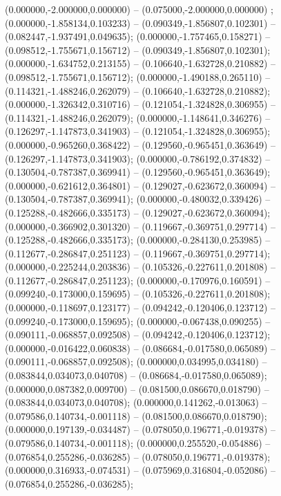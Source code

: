  (0.000000,-2.000000,0.000000) -- (0.075000,-2.000000,0.000000) ;
 (0.000000,-1.858134,0.103233) -- (0.090349,-1.856807,0.102301) -- (0.082447,-1.937491,0.049635);
 (0.000000,-1.757465,0.158271) -- (0.098512,-1.755671,0.156712) -- (0.090349,-1.856807,0.102301);
 (0.000000,-1.634752,0.213155) -- (0.106640,-1.632728,0.210882) -- (0.098512,-1.755671,0.156712);
 (0.000000,-1.490188,0.265110) -- (0.114321,-1.488246,0.262079) -- (0.106640,-1.632728,0.210882);
 (0.000000,-1.326342,0.310716) -- (0.121054,-1.324828,0.306955) -- (0.114321,-1.488246,0.262079);
 (0.000000,-1.148641,0.346276) -- (0.126297,-1.147873,0.341903) -- (0.121054,-1.324828,0.306955);
 (0.000000,-0.965260,0.368422) -- (0.129560,-0.965451,0.363649) -- (0.126297,-1.147873,0.341903);
 (0.000000,-0.786192,0.374832) -- (0.130504,-0.787387,0.369941) -- (0.129560,-0.965451,0.363649);
 (0.000000,-0.621612,0.364801) -- (0.129027,-0.623672,0.360094) -- (0.130504,-0.787387,0.369941);
 (0.000000,-0.480032,0.339426) -- (0.125288,-0.482666,0.335173) -- (0.129027,-0.623672,0.360094);
 (0.000000,-0.366902,0.301320) -- (0.119667,-0.369751,0.297714) -- (0.125288,-0.482666,0.335173);
 (0.000000,-0.284130,0.253985) -- (0.112677,-0.286847,0.251123) -- (0.119667,-0.369751,0.297714);
 (0.000000,-0.225244,0.203836) -- (0.105326,-0.227611,0.201808) -- (0.112677,-0.286847,0.251123);
 (0.000000,-0.170976,0.160591) -- (0.099240,-0.173000,0.159695) -- (0.105326,-0.227611,0.201808);
 (0.000000,-0.118697,0.123177) -- (0.094242,-0.120406,0.123712) -- (0.099240,-0.173000,0.159695);
 (0.000000,-0.067438,0.090255) -- (0.090111,-0.068857,0.092508) -- (0.094242,-0.120406,0.123712);
 (0.000000,-0.016422,0.060838) -- (0.086684,-0.017580,0.065089) -- (0.090111,-0.068857,0.092508);
 (0.000000,0.034995,0.034180) -- (0.083844,0.034073,0.040708) -- (0.086684,-0.017580,0.065089);
 (0.000000,0.087382,0.009700) -- (0.081500,0.086670,0.018790) -- (0.083844,0.034073,0.040708);
 (0.000000,0.141262,-0.013063) -- (0.079586,0.140734,-0.001118) -- (0.081500,0.086670,0.018790);
 (0.000000,0.197139,-0.034487) -- (0.078050,0.196771,-0.019378) -- (0.079586,0.140734,-0.001118);
 (0.000000,0.255520,-0.054886) -- (0.076854,0.255286,-0.036285) -- (0.078050,0.196771,-0.019378);
 (0.000000,0.316933,-0.074531) -- (0.075969,0.316804,-0.052086) -- (0.076854,0.255286,-0.036285);
